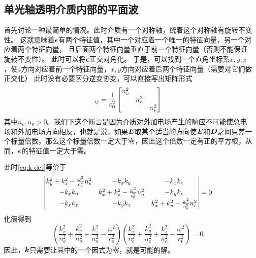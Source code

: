 \subsection{单光轴透明介质内部的平面波}\label{sec:one-axis-transparent}

首先讨论一种最简单的情况。此时介质有一个对称轴，绕着这个对称轴有旋转不变性。
这就意味着$\vb*{\epsilon}$有两个特征值，其中一个对应着一个唯一的特征向量，另一个对应着两个特征向量，
且后面两个特征向量垂直于前一个特征向量（否则不能保证旋转不变性）。
此时可以将$\vb*{\epsilon}$正交对角化。
于是，可以找到一个直角坐标系$x,y,z$，使$z$方向对应着前一个特征向量，$x,y$方向对应着后两个特征向量（需要对它们做正交化）
此时没有必要区分逆变协变，可以直接写出矩阵形式
\begin{equation}
    [\mu \epsilon_{ij}]_{ij} = \frac{1}{c_0^2} \bmqty{\dmat{n_o^2,n_o^2,n_e^2}}
    \label{eq:one-axis-matrix}
\end{equation}
其中$n_e, n_o > 0$。我们下这个断言是因为介质对外加电场产生的响应不可能使总电场和外加电场方向相反，也就是说，如果$\vb*{E}$取某个适当的方向使$\vb*{E}$和$\vb*{D}$之间只差一个标量倍数，那么这个标量倍数一定大于零，因此这个倍数一定有正的平方根，从而，$\vb*{\epsilon}$的特征值一定大于零。

此时\eqref{eq:k-det}等价于
\[
    \mdet{
        k_y^2 + k_z^2 - \frac{\omega^2}{c_0^2} n_o^2 & -k_x k_y & - k_x k_z \\
        - k_x k_y & k_x^2 + k_z^2 - \frac{\omega^2}{c_0^2} n_o^2 & -k_y k_z \\
        -k_x k_z & -k_y k_z & k_x^2 + k_y^2 - \frac{\omega^2}{c_0^2} n_e^2
    } = 0
\]
化简得到
\begin{equation}
    \left( \frac{k_x^2}{n_o^2} + \frac{k_y^2}{n_o^2} + \frac{k_z^2}{n_o^2} - \frac{\omega^2}{c_0^2} \right) \left( \frac{k_x^2}{n_e^2} + \frac{k_y^2}{n_e^2} + \frac{k_z^2}{n_o^2} - \frac{\omega^2}{c_0^2} \right) = 0
    \label{eq:uniaxial-crystal}
\end{equation}
因此，$\vb*{k}$只需要让其中的一个因式为零，就是可能的解。


